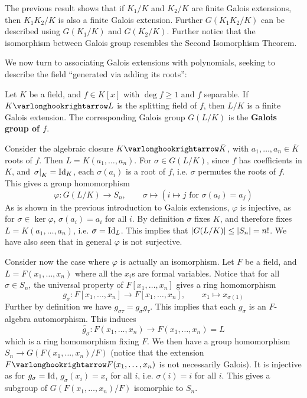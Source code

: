 \begin{remark}
    The previous result shows that if $K_1/K$ and $K_2/K$ are finite Galois extensions, then $K_1 K_2/K$ is also a finite Galois extension. Further $G(K_1 K_2/K)$ can be described using $G(K_1/K)$ and $G(K_2/K)$. Further notice that the isomorphism between Galois group resembles the Second Isomorphism Theorem.
\end{remark}

\textstart
We now turn to associating Galois extensions with polynomials, seeking to describe the field ``generated via adding its roots'':

\begin{definition}
    Let $K$ be a field, and $f \in K[x]$ with $\deg f \geq 1$ and $f$ separable. If $K \ext L$ is the splitting field of $f$, then $L/K$ is a finite Galois extension. The corresponding Galois group $G(L/K)$ is the \textbf{Galois group of $f$}.
\end{definition}

\textstart
\label{goto: order of galois group bounded by order of Sn}
Consider the algebraic closure $K \ext \bar{K}$, with $a_1, \dots, a_n \in \bar{K}$ roots of $f$. Then $L = K(a_1, \dots, a_n)$. For $\sigma \in G(L/K)$, since $f$ has coefficients in $K$, and $\left.\sigma\right|_{K} = \mathrm{Id}_K$, each $\sigma(a_i)$ is a root of $f$, i.e. $\sigma$ permutes the roots of $f$. This gives a group homomorphism
\[
    \varphi: G(L/K) \to S_n, \qquad \sigma \mapsto (i \mapsto j \text{ for $\sigma(a_i) = a_j$})
\]
As is shown in the previous introduction to Galois extensions, $\varphi$ is injective, as for $\sigma \in \ker \varphi$, $\sigma(a_i) = a_i$ for all $i$. By definition $\sigma$ fixes $K$, and therefore fixes $L = K(a_1, \dots, a_n)$, i.e. $\sigma = \mathrm{Id}_L$. This implies that $\left|G(L/K)\right| \leq \left|S_n\right| = n!$. We have also seen that in general $\varphi$ is not surjective.

Consider now the case where $\varphi$ is actually an isomorphism. Let $F$ be a field, and $L = F(x_1, \dots, x_n)$ where all the $x_i$s are formal variables. Notice that for all $\sigma \in S_n$, the universal property of $F[x_1, \dots, x_n]$ gives a ring homomorphism
\[
    g_{\sigma}: F[x_1, \dots, x_n] \to F[x_1, \dots, x_n], \qquad x_1 \mapsto x_{\sigma(1)}
\]
Further by definition we have $g_{\sigma\tau} = g_{\sigma} g_{\tau}$. This implies that each $g_{\sigma}$ is an $F$-algebra automorphism. This induces 
\[
    \widetilde{g_{\sigma}}: F(x_1, \dots, x_n) \to F(x_1, \dots, x_n) = L
\]
which is a ring homomorphism fixing $F$. We then have a group homomorphism $S_n \to G(F(x_1, \dots, x_n)/F)$ (notice that the extension $F \ext F(x_1, \dots, x_n)$ is not necessarily Galois). It is injective as for $g_{\sigma} = \mathrm{Id}$, $g_{\sigma}(x_i) = x_i$ for all $i$, i.e. $\sigma(i) = i$ for all $i$. This gives a subgroup of $G(F(x_1, \dots, x_n)/F)$ isomorphic to $S_n$.

